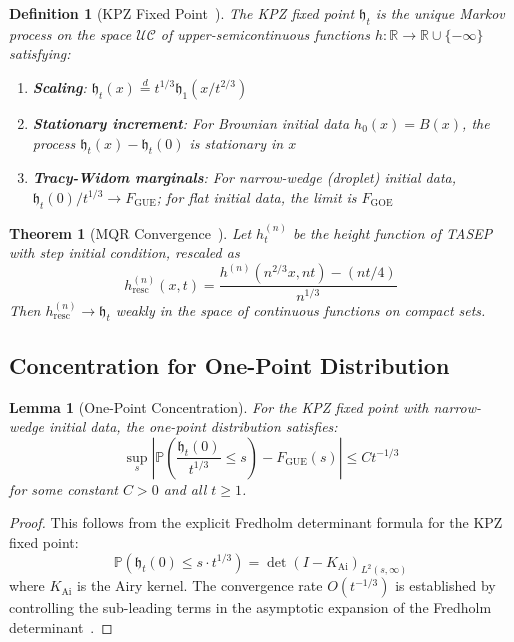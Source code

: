 \documentclass[aps,pre,reprint,amsmath,amssymb,superscriptaddress]{revtex4-2}
\newtheorem{definition}{Definition}
\newtheorem{theorem}{Theorem}
\newtheorem{lemma}{Lemma}
\newcommand{\bbP}{\mathbb{P}}
\newcommand{\bbR}{\mathbb{R}}
\begin{document}
\begin{definition}[KPZ Fixed Point~\cite{MQR2021}]
The KPZ fixed point $\mathfrak{h}_t$ is the unique Markov process on the space $\mathcal{UC}$ of upper-semicontinuous functions $h: \bbR \to \bbR \cup \{-\infty\}$ satisfying:
\begin{enumerate}
\item \textbf{Scaling}: $\mathfrak{h}_t(x) \stackrel{d}{=} t^{1/3} \mathfrak{h}_1(x/t^{2/3})$
\item \textbf{Stationary increment}: For Brownian initial data $h_0(x) = B(x)$, the process $\mathfrak{h}_t(x) - \mathfrak{h}_t(0)$ is stationary in $x$
\item \textbf{Tracy-Widom marginals}: For narrow-wedge (droplet) initial data, $\mathfrak{h}_t(0)/t^{1/3} \to F_{\text{GUE}}$; for flat initial data, the limit is $F_{\text{GOE}}$
\end{enumerate}
\end{definition}

\begin{theorem}[MQR Convergence~\cite{MQR2021}]
\label{thm:MQR}
Let $h^{(n)}_t$ be the height function of TASEP with step initial condition, rescaled as
\begin{equation}
h^{(n)}_{\text{resc}}(x,t) = \frac{h^{(n)}(n^{2/3}x, nt) - (nt/4)}{n^{1/3}}
\end{equation}
Then $h^{(n)}_{\text{resc}} \to \mathfrak{h}_t$ weakly in the space of continuous functions on compact sets.
\end{theorem}

\subsection{Concentration for One-Point Distribution}

\begin{lemma}[One-Point Concentration]
\label{lem:one-point}
For the KPZ fixed point with narrow-wedge initial data, the one-point distribution satisfies:
\begin{equation}
\sup_s \left| \bbP\left(\frac{\mathfrak{h}_t(0)}{t^{1/3}} \leq s\right) - F_{\text{GUE}}(s) \right| \leq C t^{-1/3}
\end{equation}
for some constant $C > 0$ and all $t \geq 1$.
\end{lemma}

\begin{proof}
This follows from the explicit Fredholm determinant formula for the KPZ fixed point:
\begin{equation}
\bbP(\mathfrak{h}_t(0) \leq s \cdot t^{1/3}) = \det(I - K_{\text{Ai}})_{L^2(s,\infty)}
\end{equation}
where $K_{\text{Ai}}$ is the Airy kernel. The convergence rate $O(t^{-1/3})$ is established by controlling the sub-leading terms in the asymptotic expansion of the Fredholm determinant~\cite{FerrariSpohn2006}.
\end{proof}
\end{document}
